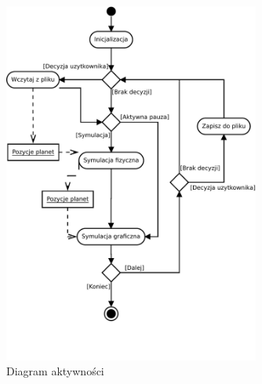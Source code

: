 \begin{figure}[ht!]
	\centering
	\includegraphics[width=0.75\textwidth]{activity.pdf}
	\caption{Diagram aktywności}
	\label{fig:activity}
\end{figure}


